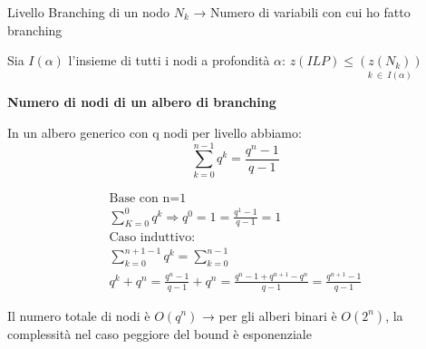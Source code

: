 Livello Branching di un nodo $N_k$ → Numero di variabili con cui ho fatto branching

Sia $I(\alpha)$ l’insieme di tutti i nodi a profondità $\alpha$:
$z(ILP)\leqslant \underset{k\ \in\ I(\alpha)}{(z(N_k))}$

\textbf{Numero di nodi di un albero di branching}

In un albero generico con q nodi per livello abbiamo: 
\[
\sum_{k=0}^{n-1} q^k=\frac{q^n-1}{q-1}
\]
\begin{myproof}
    \[
    \begin{array}{c}
        \text{Base con n=1}\\
        \sum^0_{K=0}q^k\Rightarrow q^0 = 1= \frac{q^1-1}{q-1}=1\\
        \text{Caso induttivo:}\\
        \sum_{k=0}^{n+1-1} q^k=\sum_{k=0}^{n-1}\\
         q^k+q^n=\frac{q^n-1}{q-1}+q^n=\frac{q^n-1+q^{n+1}-q^n}{q-1}=\frac{q^{n+1}-1}{q-1}
    \end{array}
    \]
\end{myproof}

Il numero totale di nodi è $O(q^n)$ → per gli alberi binari è $O(2^n)$,
 la complessità nel caso peggiore del bound è esponenziale

